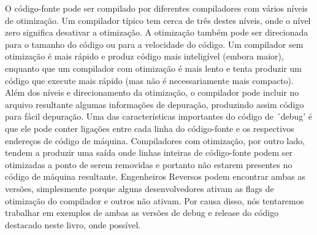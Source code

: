 O código-fonte pode ser compilado por diferentes compiladores com vários níveis de otimização.
Um compilador típico tem cerca de três destes níveis, onde o nível zero significa desativar a otimização.
A otimização também pode ser direcionada para o tamanho do código ou para a velocidade do código.
Um compilador sem otimização é mais rápido e produz código mais inteligível (embora maior),
enquanto que um compilador com otimização é mais lento e tenta produzir um código que execute mais rápido (mas não é necessariamente mais compacto).
Além dos níveis e direcionamento da otimização, o compilador pode incluir no arquivo resultante algumas informações de depuração, produzindo assim código para fácil depuração.
Uma das características importantes do código de ´debug' é que ele pode conter 
ligações entre cada linha do código-fonte e os respectivos endereços de código de máquina.
Compiladores com otimização, por outro lado, tendem a produzir uma saída onde linhas inteiras de código-fonte podem ser otimizadas a ponto de serem removidas e portanto não estarem presentes no código de máquina resultante.
Engenheiros Reversos podem encontrar ambas as versões, simplesmente porque alguns desenvolvedores ativam as flags de otimização do compilador e outros não ativam. 
Por causa disso, nós tentaremos trabalhar em exemplos de ambas as versões de debug e release do código destacado neste livro, onde possível.
\fi
